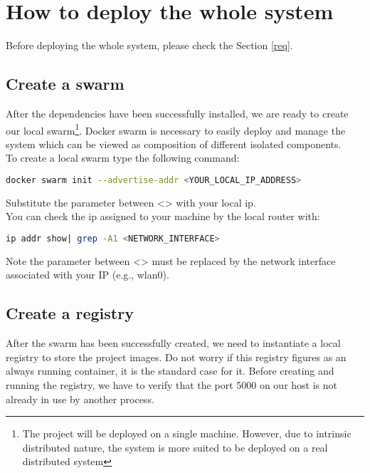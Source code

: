 \section{How to deploy the whole system}

Before deploying the whole system, please check the Section \ref{req}.

\subsection{Create a swarm}

After the dependencies have been successfully installed,
we are ready to create our local swarm\footnote{The project will be deployed
on a single machine. However, due to intrinsic distributed nature, the system
is more suited to be deployed on a real distributed system}.
Docker swarm is necessary to easily deploy and manage the system which can be
viewed as composition of different isolated components.
\\
To create a local swarm type the following command:

\begin{lstlisting}[language=bash]
docker swarm init --advertise-addr <YOUR_LOCAL_IP_ADDRESS>
\end{lstlisting}

Substitute the parameter between <> with your local ip.
\\
You can check the ip assigned to your machine by the local router with:

\begin{lstlisting}[language=bash]
ip addr show| grep -A1 <NETWORK_INTERFACE>
\end{lstlisting}

Note the parameter between <> must
be replaced by the network interface associated with your IP (e.g., wlan0).



\subsection{Create a registry}

After the swarm has been successfully created, we need to instantiate a local
registry to store the project images. Do not worry if this registry figures as
an always running container, it is the standard case for it.
Before creating and running the registry, we have to verify that the port 5000
on our host is not already in use by another process.


